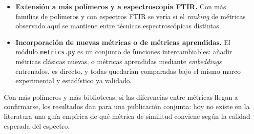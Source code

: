 \begin{itemize}
    \item \textbf{Extensión a más polímeros y a espectroscopía FTIR.} Con más familias de polímeros y con espectros FTIR se vería si el \textit{ranking} de métricas observado aquí se mantiene entre técnicas espectroscópicas distintas.
    \item \textbf{Incorporación de nuevas métricas o de métricas aprendidas.} El módulo \texttt{metrics.py} es un conjunto de funciones intercambiables: añadir métricas clásicas nuevas, o métricas aprendidas mediante \textit{embeddings} entrenados, es directo, y todas quedarían comparadas bajo el mismo marco experimental y estadístico ya validado.
\end{itemize}

Con más polímeros y más bibliotecas, si las diferencias entre métricas llegan a confirmarse, los resultados dan para una publicación conjunta: hoy no existe en la literatura una guía empírica de qué métrica de similitud conviene según la calidad esperada del espectro.
